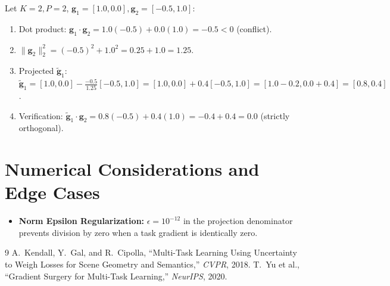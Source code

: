 \documentclass[11pt]{article}
\begin{document}
Let $K = 2, P = 2$, $\mathbf{g}_1 = [1.0, 0.0], \mathbf{g}_2 = [-0.5, 1.0]$:
\begin{enumerate}
    \item Dot product: $\mathbf{g}_1 \cdot \mathbf{g}_2 = 1.0(-0.5) + 0.0(1.0) = -0.5 < 0$ (conflict).
    \item $\|\mathbf{g}_2\|_2^2 = (-0.5)^2 + 1.0^2 = 0.25 + 1.0 = 1.25$.
    \item Projected $\tilde{\mathbf{g}}_1$:
    $\tilde{\mathbf{g}}_1 = [1.0, 0.0] - \frac{-0.5}{1.25}[-0.5, 1.0] = [1.0, 0.0] + 0.4[-0.5, 1.0] = [1.0 - 0.2, 0.0 + 0.4] = [0.8, 0.4]$.
    \item Verification: $\tilde{\mathbf{g}}_1 \cdot \mathbf{g}_2 = 0.8(-0.5) + 0.4(1.0) = -0.4 + 0.4 = 0.0$ (strictly orthogonal).
\end{enumerate}

\section{Numerical Considerations and Edge Cases}
\label{sec:numerical}

\begin{itemize}
    \item \textbf{Norm Epsilon Regularization:} $\epsilon = 10^{-12}$ in the projection denominator prevents division by zero when a task gradient is identically zero.
\end{itemize}

\begin{thebibliography}{9}
 A.~Kendall, Y.~Gal, and R.~Cipolla, ``Multi-Task Learning Using Uncertainty to Weigh Losses for Scene Geometry and Semantics,'' \emph{CVPR}, 2018.
 T.~Yu et al., ``Gradient Surgery for Multi-Task Learning,'' \emph{NeurIPS}, 2020.
\end{thebibliography}
\end{document}

